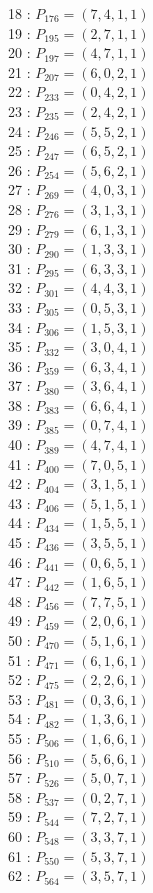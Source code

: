 \documentclass{article}
\begin{document}
{\begin{multicols}{2}
18 : $P_{176}=( 7, 4, 1, 1 )$\\
19 : $P_{195}=( 2, 7, 1, 1 )$\\
20 : $P_{197}=( 4, 7, 1, 1 )$\\
21 : $P_{207}=( 6, 0, 2, 1 )$\\
22 : $P_{233}=( 0, 4, 2, 1 )$\\
23 : $P_{235}=( 2, 4, 2, 1 )$\\
24 : $P_{246}=( 5, 5, 2, 1 )$\\
25 : $P_{247}=( 6, 5, 2, 1 )$\\
26 : $P_{254}=( 5, 6, 2, 1 )$\\
27 : $P_{269}=( 4, 0, 3, 1 )$\\
28 : $P_{276}=( 3, 1, 3, 1 )$\\
29 : $P_{279}=( 6, 1, 3, 1 )$\\
30 : $P_{290}=( 1, 3, 3, 1 )$\\
31 : $P_{295}=( 6, 3, 3, 1 )$\\
32 : $P_{301}=( 4, 4, 3, 1 )$\\
33 : $P_{305}=( 0, 5, 3, 1 )$\\
34 : $P_{306}=( 1, 5, 3, 1 )$\\
35 : $P_{332}=( 3, 0, 4, 1 )$\\
36 : $P_{359}=( 6, 3, 4, 1 )$\\
37 : $P_{380}=( 3, 6, 4, 1 )$\\
38 : $P_{383}=( 6, 6, 4, 1 )$\\
39 : $P_{385}=( 0, 7, 4, 1 )$\\
40 : $P_{389}=( 4, 7, 4, 1 )$\\
41 : $P_{400}=( 7, 0, 5, 1 )$\\
42 : $P_{404}=( 3, 1, 5, 1 )$\\
43 : $P_{406}=( 5, 1, 5, 1 )$\\
44 : $P_{434}=( 1, 5, 5, 1 )$\\
45 : $P_{436}=( 3, 5, 5, 1 )$\\
46 : $P_{441}=( 0, 6, 5, 1 )$\\
47 : $P_{442}=( 1, 6, 5, 1 )$\\
48 : $P_{456}=( 7, 7, 5, 1 )$\\
49 : $P_{459}=( 2, 0, 6, 1 )$\\
50 : $P_{470}=( 5, 1, 6, 1 )$\\
51 : $P_{471}=( 6, 1, 6, 1 )$\\
52 : $P_{475}=( 2, 2, 6, 1 )$\\
53 : $P_{481}=( 0, 3, 6, 1 )$\\
54 : $P_{482}=( 1, 3, 6, 1 )$\\
55 : $P_{506}=( 1, 6, 6, 1 )$\\
56 : $P_{510}=( 5, 6, 6, 1 )$\\
57 : $P_{526}=( 5, 0, 7, 1 )$\\
58 : $P_{537}=( 0, 2, 7, 1 )$\\
59 : $P_{544}=( 7, 2, 7, 1 )$\\
60 : $P_{548}=( 3, 3, 7, 1 )$\\
61 : $P_{550}=( 5, 3, 7, 1 )$\\
62 : $P_{564}=( 3, 5, 7, 1 )$\\
\end{multicols}
}
\end{document}
